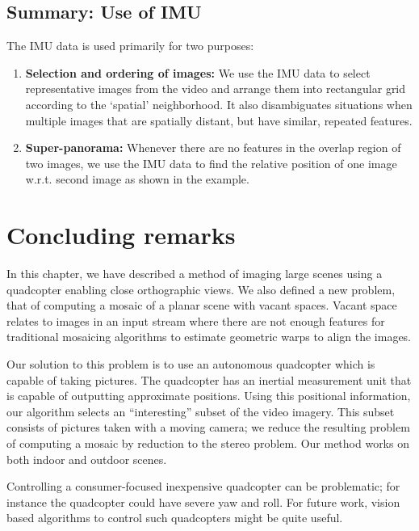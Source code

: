 \subsection{Summary: Use of IMU}
The IMU data is used primarily for two purposes:
\begin{enumerate}
\item \textbf{Selection and ordering of images:} We use the IMU data
  to select representative images from the video and arrange them into
  rectangular grid according to the `spatial' neighborhood. It also
  disambiguates situations when multiple images that are spatially
  distant, but have similar, repeated features.

\item \textbf{Super-panorama:} Whenever there are no features in
  the overlap region of two images, we use the IMU data to find the
  relative position of one image w.r.t. second image as shown in the
  example. 
\end{enumerate}


\section{Concluding remarks}

In this chapter, we have described a method of imaging large scenes
using a quadcopter enabling close orthographic views. We also defined
a new problem, that of computing a mosaic of a planar scene with
vacant spaces.  Vacant space relates to images in an input stream
where there are not enough features for traditional mosaicing
algorithms to estimate geometric warps to align the images.

Our solution to this problem is to use an autonomous quadcopter which
is capable of taking pictures.  The quadcopter has an inertial
measurement unit that is capable of outputting approximate
positions. Using this positional information, our algorithm selects an
``interesting'' subset of the video imagery.  This subset consists of
pictures taken with a moving camera; we reduce the resulting
problem of computing a mosaic by reduction to the stereo problem.  Our
method works on both indoor and outdoor scenes.

Controlling a consumer-focused inexpensive quadcopter can be
problematic; for instance the quadcopter could have severe yaw and
roll.  For future work, vision based algorithms to control such
quadcopters might be quite useful.